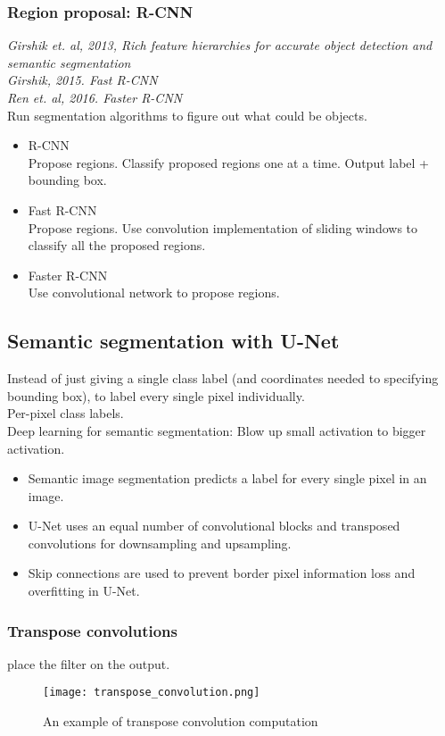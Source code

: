 \subsubsection{Region proposal: R-CNN}
\textit{Girshik et. al, 2013, Rich feature hierarchies for accurate object detection and semantic segmentation}\\
\textit{Girshik, 2015. Fast R-CNN}\\
\textit{Ren et. al, 2016. Faster R-CNN}\\
Run segmentation algorithms to figure out what could be objects.
\begin{itemize}
\item[]
R-CNN\\
Propose regions. Classify proposed regions one at a time. Output label + bounding box.
\item[]
Fast R-CNN\\
Propose regions. Use convolution implementation of sliding windows to classify all the proposed regions.
\item[]
Faster R-CNN\\
Use convolutional network to propose regions.
\end{itemize}

%
\subsection{Semantic segmentation with U-Net}
Instead of just giving a single class label (and coordinates needed to specifying bounding box), to label every single pixel individually.\\
Per-pixel class labels.\\
Deep learning for semantic segmentation: Blow up small activation to bigger activation.
\begin{itemize}
\item
Semantic image segmentation predicts a label for every single pixel in an image.
\item
U-Net uses an equal number of convolutional blocks and transposed convolutions for downsampling and upsampling.
\item
Skip connections are used to prevent border pixel information loss and overfitting in U-Net.
\end{itemize}
\subsubsection{Transpose convolutions}
place the filter on the output.
\begin{figure}[h]
    \centering
    \texttt{[image: transpose\_convolution.png]}
    \caption{An example of transpose convolution computation}
    \label{fig:transposeCON}
\end{figure}

